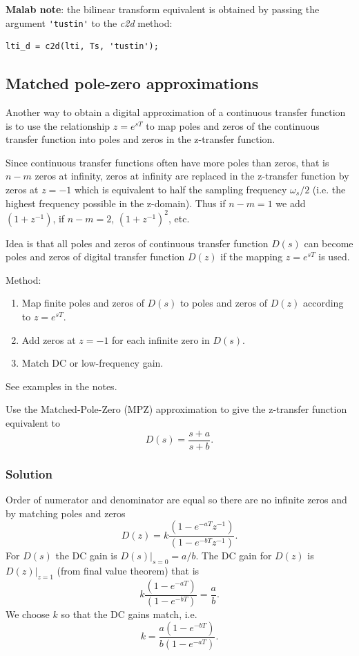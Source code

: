\textbf{Malab note}: the bilinear transform equivalent is obtained by passing the argument \verb|'tustin'| to the \emph{c2d} method:
\begin{verbatim}
lti_d = c2d(lti, Ts, 'tustin');
\end{verbatim}

\subsection*{Matched pole-zero approximations}

Another way to obtain a digital approximation of a continuous transfer function
is to use the relationship $z = e^{sT}$ to map poles and zeros of the continuous
transfer function into poles and zeros in the z-transfer function.

Since continuous transfer functions often have more poles than zeros,
that is $n-m$ zeros at infinity, zeros at infinity are replaced in the z-transfer
function by zeros at $z = -1$ which is equivalent to half the sampling frequency
$\omega_s/2$ (i.e. the highest frequency possible in the z-domain).
Thus if $n-m =1$ we add $(1+z^{-1})$, if $n-m=2$, $(1+z^{-1})^2$, etc.

\begin{slide}\label{slides:l11s24}
	Idea is that all poles and zeros of continuous transfer function $D(s)$ can
  become poles and zeros of digital transfer function $D(z)$ if the mapping
  $z=e^{sT}$ is used.

	Method:
	\begin{enumerate}
		\item Map finite poles and zeros of $D(s)$ to poles and zeros of $D(z)$ according to $z=e^{sT}$.
		\item Add zeros at $z=-1$ for each infinite zero in $D(s)$.
		\item Match DC or low-frequency gain.
	\end{enumerate}
	See examples in the notes.
\end{slide}

\begin{slide}
Use the Matched-Pole-Zero (MPZ) approximation to give the z-transfer function equivalent to
$$D(s)=\frac{s+a}{s+b}.$$
\end{slide}
\subsubsection*{Solution}
Order of numerator and denominator are equal so there are no infinite zeros and
by matching poles and zeros
$$D(z)=k\frac{(1-e^{-aT}z^{-1})}{(1 - e^{-bT}z^{-1})}.$$
For $D(s)$ the DC gain is $D(s)|_{s=0} = a/b$.
The DC gain for $D(z)$ is $D(z)|_{z=1}$ (from final value theorem) that is
$$k\frac{(1-e^{-aT})}{(1-e^{-bT})} = \frac{a}{b}.$$
We choose $k$ so that the DC gains match, i.e.
$$k=\frac{a(1-e^{-bT})}{b(1-e^{-aT})}.$$

